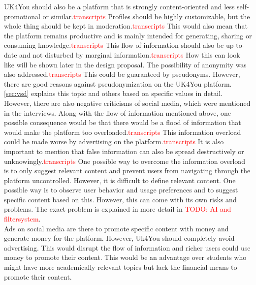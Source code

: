 UK4You should also be a platform that is strongly content-oriented and less self-promotional or similar.\textcolor{red}{transcripts}
Profiles should be highly customizable, but the whole thing should be kept in moderation.\textcolor{red}{transcripts}
This would also mean that the platform remains productive and is mainly intended for generating, sharing or consuming knowledge.\textcolor{red}{transcripts}
This flow of information should also be up-to-date and not disturbed by marginal information.\textcolor{red}{transcripts}
How this can look like will be shown later in the design proposal.
The possibility of anonymity was also addressed.\textcolor{red}{transcripts}
This could be guaranteed by pseudonyms.
However, there are good reasons against pseudonymization on the UK4You platform.
\autoref{sec:vsd} explains this topic and others based on specific values in detail.\\

However, there are also negative criticisms of social media, which were mentioned in the interviews.
Along with the flow of information mentioned above, one possible consequence would be that there would be a flood of information that would make the platform too overloaded.\textcolor{red}{transcripts}
This information overload could be made worse by advertising on the platform.\textcolor{red}{transcripts}
It is also important to mention that false information can also be spread destructively or unknowingly.\textcolor{red}{transcripts}
One possible way to overcome the information overload is to only suggest relevant content and prevent users from navigating through the platform uncontrolled.
However, it is difficult to define relevant content.
One possible way is to observe user behavior and usage preferences and to suggest specific content based on this.
However, this can come with its own risks and problems.
The exact problem is explained in more detail in \textcolor{red}{TODO: AI and filtersystem}.\\

Ads on social media are there to promote specific content with money and generate money for the platform.
However, Uk4You should completely avoid advertising.
This would disrupt the flow of information and richer users could use money to promote their content.
This would be an advantage over students who might have more academically relevant topics but lack the financial means to promote their content.\\

